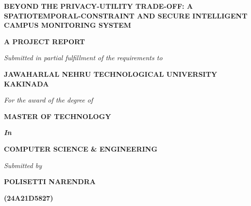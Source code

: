 \documentclass[12pt,a4paper,oneside]{report}
\begin{document}
\begin{titlepage}
\setlength{\parskip}{4pt}
\begin{center}
    \vspace*{0.15in}
    
    {\fontsize{18}{22}\bfseries\selectfont\color{black} BEYOND THE PRIVACY-UTILITY TRADE-OFF: A SPATIOTEMPORAL-CONSTRAINT AND SECURE INTELLIGENT CAMPUS MONITORING SYSTEM\par}
    
    \vspace{0.2in}
    {\fontsize{12}{14}\bfseries\selectfont\color{scetred} A PROJECT REPORT\par}
    \vspace{0.02in}
    {\fontsize{10}{12}\itshape\selectfont\color{scetgreen} Submitted in partial fulfillment of the requirements to\par}
    
    \vspace{0.05in}
    {\fontsize{13}{15}\bfseries\selectfont\color{scetred} JAWAHARLAL NEHRU TECHNOLOGICAL UNIVERSITY KAKINADA\par}
    \vspace{0.02in}
    {\fontsize{10}{12}\itshape\selectfont\color{scetgreen} For the award of the degree of\par}
    
    \vspace{0.05in}
    {\fontsize{14}{16}\bfseries\selectfont\color{scetred} MASTER OF TECHNOLOGY\par}
    \vspace{0.02in}
    {\fontsize{10}{12}\itshape\bfseries\selectfont\color{scetgreen} In\par} 
    \vspace{0.02in}
    {\fontsize{14}{16}\bfseries\selectfont\color{scetred} COMPUTER SCIENCE \& ENGINEERING\par}
    
    \vspace{0.12in}
    {\fontsize{10}{12}\itshape\selectfont\color{scetgreen} Submitted by\par}
    \vspace{0.02in}
    {\fontsize{13}{15}\bfseries\selectfont\color{scetorange} POLISETTI NARENDRA\par}
    {\fontsize{11}{13}\bfseries\selectfont\color{scetorange} (24A21D5827)\par}
    

\end{center}
\end{titlepage}
\end{document}
